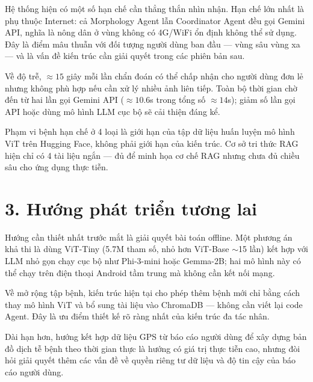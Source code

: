 \documentclass[13pt,a4paper]{extreport}
\begin{document}
Hệ thống hiện có một số hạn chế cần thẳng thắn nhìn nhận. Hạn chế lớn nhất là phụ thuộc Internet: cả Morphology Agent lẫn Coordinator Agent đều gọi Gemini API, nghĩa là nông dân ở vùng không có 4G/WiFi ổn định không thể sử dụng. Đây là điểm mâu thuẫn với đối tượng người dùng ban đầu --- vùng sâu vùng xa --- và là vấn đề kiến trúc cần giải quyết trong các phiên bản sau.

Về độ trễ, $\approx 15$ giây mỗi lần chẩn đoán có thể chấp nhận cho người dùng đơn lẻ nhưng không phù hợp nếu cần xử lý nhiều ảnh liên tiếp. Toàn bộ thời gian chờ đến từ hai lần gọi Gemini API ($\approx 10.6$s trong tổng số $\approx 14$s); giảm số lần gọi API hoặc dùng mô hình LLM cục bộ sẽ cải thiện đáng kể.

Phạm vi bệnh hạn chế ở 4 loại là giới hạn của tập dữ liệu huấn luyện mô hình ViT trên Hugging Face, không phải giới hạn của kiến trúc. Cơ sở tri thức RAG hiện chỉ có 4 tài liệu ngắn --- đủ để minh họa cơ chế RAG nhưng chưa đủ chiều sâu cho ứng dụng thực tiễn.

\section*{3. Hướng phát triển tương lai}

Hướng cần thiết nhất trước mắt là giải quyết bài toán offline. Một phương án khả thi là dùng ViT-Tiny (5.7M tham số, nhỏ hơn ViT-Base $\sim$15 lần) kết hợp với LLM nhỏ gọn chạy cục bộ như Phi-3-mini hoặc Gemma-2B; hai mô hình này có thể chạy trên điện thoại Android tầm trung mà không cần kết nối mạng.

Về mở rộng tập bệnh, kiến trúc hiện tại cho phép thêm bệnh mới chỉ bằng cách thay mô hình ViT và bổ sung tài liệu vào ChromaDB --- không cần viết lại code Agent. Đây là ưu điểm thiết kế rõ ràng nhất của kiến trúc đa tác nhân.

Dài hạn hơn, hướng kết hợp dữ liệu GPS từ báo cáo người dùng để xây dựng bản đồ dịch tễ bệnh theo thời gian thực là hướng có giá trị thực tiễn cao, nhưng đòi hỏi giải quyết thêm các vấn đề về quyền riêng tư dữ liệu và độ tin cậy của báo cáo người dùng.
\clearpage
\end{document}
